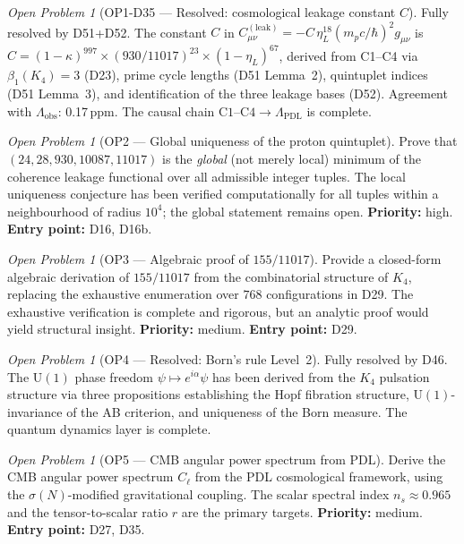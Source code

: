 \documentclass[11pt,a4paper]{article}
\theoremstyle{plain}
\theoremstyle{definition}
\theoremstyle{remark}
\newtheorem{openproblem}[theorem]{Open Problem}
\newcommand{\sigmaN}{\sigma(N)}
\begin{document}
\begin{openproblem}[OP1-D35 --- Resolved: cosmological leakage constant $C$]
\label{op:leakconstant}
\textcolor{proofblue}{Fully resolved by D51+D52.} The constant $C$ in $C^{(\mathrm{leak})}_{\mu\nu}=-C\,\eta_L^{18}(m_p c/\hbar)^2 g_{\mu\nu}$ is $C=(1-\kappa)^{997}\times(930/11017)^{23}\times(1-\eta_L)^{67}$, derived from C1--C4 via $\beta_1(K_4)=3$ (D23), prime cycle lengths (D51 Lemma~2), quintuplet indices (D51 Lemma~3), and identification of the three leakage bases (D52). Agreement with $\Lambda_{\mathrm{obs}}$: 0.17\,ppm. The causal chain $\mathrm{C1\text{--}C4}\to\Lambda_{\mathrm{PDL}}$ is complete.
\end{openproblem}

\begin{openproblem}[OP2 --- Global uniqueness of the proton quintuplet]
\label{op:uniqueness}
Prove that \\  $(24, 28, 930, 10087, 11017)$ is the \emph{global} (not merely local) minimum of the coherence leakage functional over all admissible integer tuples. The local uniqueness conjecture has been verified computationally for all tuples within a neighbourhood of radius $10^4$; the global statement remains open. \textbf{Priority:} high. \textbf{Entry point:} D16, D16b.
\end{openproblem}

\begin{openproblem}[OP3 --- Algebraic proof of $155/11017$]
\label{op:gate1algebraic}
Provide a closed-form algebraic derivation of $155/11017$ from the combinatorial structure of $K_4$, replacing the exhaustive enumeration over $768$ configurations in D29. The exhaustive verification is complete and rigorous, but an analytic proof would yield structural insight. \textbf{Priority:} medium. \textbf{Entry point:} D29.
\end{openproblem}

\begin{openproblem}[OP4 --- Resolved: Born's rule Level~2]
\label{op:bornlevel2}
\textcolor{proofblue}{Fully resolved by D46.} The $\mathrm{U}(1)$ phase freedom $\psi \mapsto e^{i\alpha}\psi$ has been derived from the $K_4$ pulsation structure via three propositions establishing the Hopf fibration structure, $\mathrm{U}(1)$-invariance of the AB criterion, and uniqueness of the Born measure. The quantum dynamics layer is complete.
\end{openproblem}

\begin{openproblem}[OP5 --- CMB angular power spectrum from PDL]
\label{op:CMBspectrum}
Derive the CMB angular power spectrum $C_\ell$ from the PDL cosmological framework, using the $\sigmaN$-modified gravitational coupling. The scalar spectral index $n_s \approx 0.965$ and the tensor-to-scalar ratio $r$ are the primary targets. \textbf{Priority:} medium. \textbf{Entry point:} D27, D35.
\end{openproblem}
\end{document}
